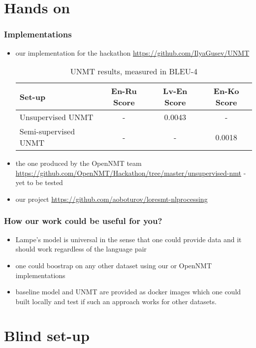 \documentclass{beamer}
\begin{document}
\section{Hands on}

\begin{frame}
\frametitle{Implementations}

\begin{itemize}
\item our implementation for the hackathon \url{https://github.com/IlyaGusev/UNMT}
\begin{table}
\begin{tabular}{l c c c}
\toprule
Set-up & En-Ru Score & Lv-En Score & En-Ko Score\\
\midrule
Unsupervised UNMT & - & 0.0043 & - \\
Semi-supervised UNMT & - & - & 0.0018 \\
\bottomrule
\end{tabular}
\caption{UNMT results, measured in BLEU-4}
\end{table}
\item<2-3> the one produced by the OpenNMT team \url{https://github.com/OpenNMT/Hackathon/tree/master/unsupervised-nmt} - yet to be tested
\item<3> our project \url{https://github.com/aoboturov/loresmt-nlprocessing}
\end{itemize}
\end{frame}

\begin{frame}
\frametitle{How our work could be useful for you?}

\begin{itemize}
\item Lampe's model is universal in the sense that one could provide data and it should work regardless of the language pair
\item one could boostrap on any other dataset using our or OpenNMT implementations
\item baseline model and UNMT are provided as docker images which one could built locally and test if such an approach works for other datasets.
\end{itemize}

\end{frame}

\section{Blind set-up}
\end{document}
